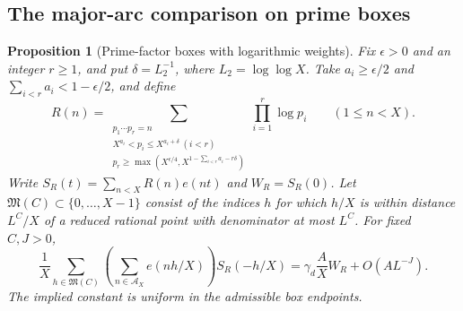 \documentclass[11pt,a4paper]{article}
\theoremstyle{paperplain}
\newtheorem{proposition}[theorem]{Proposition}
\numberwithin{equation}{section}
\begin{document}
\subsection{The major-arc comparison on prime boxes}

\begin{proposition}[Prime-factor boxes with logarithmic weights]\label{arith:major}
Fix $\epsilon>0$ and an integer $r\ge1$, and put $\delta=L_2^{-1}$,
where $L_2=\log\log X$.
Take $a_i\ge\epsilon/2$ and $\sum_{i<r}a_i<1-\epsilon/2$, and define
\[
 R(n)=\sum_{\substack{p_1\cdots p_r=n\\
 X^{a_i}<p_i\le X^{a_i+\delta}\ (i<r)\\
 p_r\ge\max(X^{\epsilon/4},X^{1-\sum_{i<r}a_i-r\delta})}}
       \prod_{i=1}^r\log p_i\qquad(1\le n<X).
\]
Write $S_R(t)=\sum_{n<X}R(n)e(nt)$ and $W_R=S_R(0)$.
Let $\mathfrak M(C)\subset\{0,\ldots,X-1\}$ consist of the indices $h$
for which $h/X$ is within distance $L^C/X$ of a reduced rational point
with denominator at most $L^C$. For fixed $C,J>0$,
\begin{equation}\label{arith:majorformula}
 \frac1X\sum_{h\in\mathfrak M(C)}
       \left(\sum_{n\in\mathcal A_X}e(nh/X)\right)S_R(-h/X)
   =\gamma_d\frac AX W_R+O(A L^{-J}).
\end{equation}
The implied constant is uniform in the admissible box endpoints.
\end{proposition}
\end{document}
